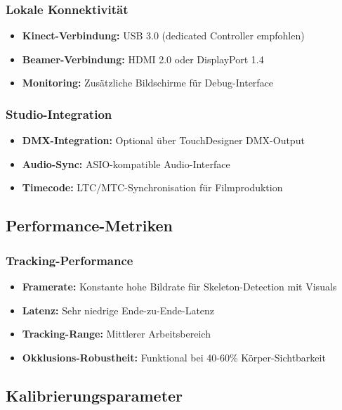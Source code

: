 \subsubsection{Lokale Konnektivität}
\begin{itemize}
    \item \textbf{Kinect-Verbindung:} USB 3.0 (dedicated Controller empfohlen)
    \item \textbf{Beamer-Verbindung:} HDMI 2.0 oder DisplayPort 1.4
    \item \textbf{Monitoring:} Zusätzliche Bildschirme für Debug-Interface
\end{itemize}

\subsubsection{Studio-Integration}
\begin{itemize}
    \item \textbf{DMX-Integration:} Optional über TouchDesigner DMX-Output
    \item \textbf{Audio-Sync:} ASIO-kompatible Audio-Interface
    \item \textbf{Timecode:} LTC/MTC-Synchronisation für Filmproduktion
\end{itemize}

\subsection{Performance-Metriken}

\subsubsection{Tracking-Performance}
\begin{itemize}
    \item \textbf{Framerate:} Konstante hohe Bildrate für Skeleton-Detection mit Visuals
    \item \textbf{Latenz:} Sehr niedrige Ende-zu-Ende-Latenz
    \item \textbf{Tracking-Range:} Mittlerer Arbeitsbereich
    \item \textbf{Okklusions-Robustheit:} Funktional bei 40-60\% Körper-Sichtbarkeit
\end{itemize}

\subsection{Kalibrierungsparameter}

